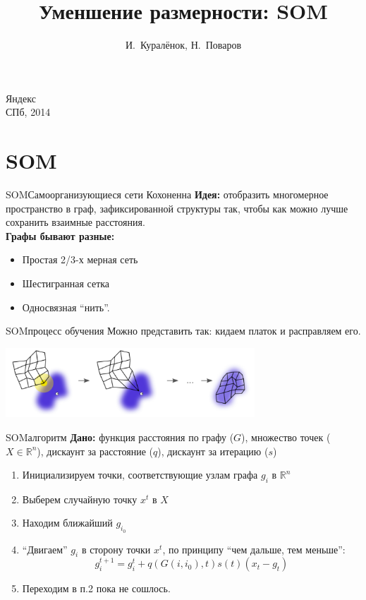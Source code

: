 \documentclass[14pt, fleqn, xcolor={dvipsnames, table}]{beamer}
\title{Уменшение размерности: SOM\\\small{}}
\author[]{\small{%
И.~Куралёнок,
Н.~Поваров}}
\date{}
\begin{document}
\begin{frame}
\maketitle
\small
\begin{center}
\vspace{-60pt}
\normalsize {\color{red}Я}ндекс \\
\vspace{80pt}
\footnotesize СПб, 2014
\end{center}
\end{frame}
\section{SOM}

\begin{frame}{SOM}{Самоорганизующиеся сети Кохоненна}
\textbf{Идея:} отобразить многомерное пространство в граф, зафиксированной структуры так, чтобы как можно лучше сохранить взаимные расстояния. \\
\textbf{Графы бывают разные:}
\begin{itemize}
  \item Простая 2/3-х мерная сеть
  \item Шестигранная сетка
  \item Односвязная “нить”.
\end{itemize}
\end{frame}

\begin{frame}{SOM}{процесс обучения}
Можно представить так: кидаем платок и расправляем его.
\begin{center}\includegraphics[width=0.7\textwidth]{SOM.png}\end{center}
\end{frame}

\begin{frame}{SOM}{алгоритм}
\textbf{Дано:} функция расстояния по графу ($G$), множество точек ($X \in \mathbb{R}^n$), дискаунт за расстояние ($q$), дискаунт за итерацию ($s$) 
\begin{enumerate}
  \item Инициализируем точки, соответствующие узлам графа $g_i$ в $\mathbb{R}^n$
  \item Выберем случайную точку $x^t$ в $X$
  \item Находим ближайший $g_{i_0}$
  \item ``Двигаем'' $g_i$ в сторону точки $x^t$, по принципу ``чем дальше, тем меньше'':
  $$
    g_i^{t+1} = g_i^t + q(G(i, i_0), t)s(t)(x_t - g_t)
  $$
  \item Переходим в п.2 пока не сошлось.
\end{enumerate}
\end{frame}
\end{document}

